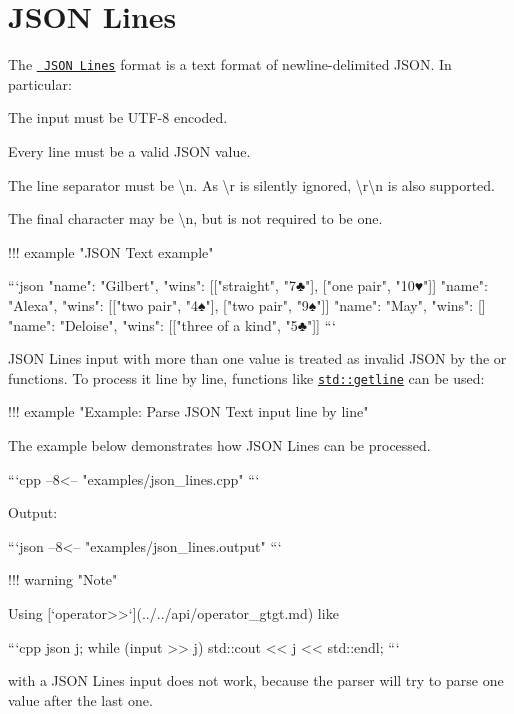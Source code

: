 \chapter{JSON Lines}
\hypertarget{md_build_2dt__core_2__deps_2nlohmann__json-src_2docs_2mkdocs_2docs_2features_2parsing_2json__lines}{}\label{md_build_2dt__core_2__deps_2nlohmann__json-src_2docs_2mkdocs_2docs_2features_2parsing_2json__lines}
\label{md_build_2dt__core_2__deps_2nlohmann__json-src_2docs_2mkdocs_2docs_2features_2parsing_2json__lines_autotoc_md1422}%
%
 The \href{https://jsonlines.org}{\texttt{ JSON Lines}} format is a text format of newline-\/delimited JSON. In particular\+:


\begin{DoxyEnumerate}
\item The input must be UTF-\/8 encoded.
\item Every line must be a valid JSON value.
\item The line separator must be {\ttfamily \textbackslash{}n}. As {\ttfamily \textbackslash{}r} is silently ignored, {\ttfamily \textbackslash{}r\textbackslash{}n} is also supported.
\item The final character may be {\ttfamily \textbackslash{}n}, but is not required to be one.
\end{DoxyEnumerate}

!!! example "{}\+JSON Text example"{} \begin{DoxyVerb}```json
{"name": "Gilbert", "wins": [["straight", "7♣"], ["one pair", "10♥"]]}
{"name": "Alexa", "wins": [["two pair", "4♠"], ["two pair", "9♠"]]}
{"name": "May", "wins": []}
{"name": "Deloise", "wins": [["three of a kind", "5♣"]]}
```
\end{DoxyVerb}
 JSON Lines input with more than one value is treated as invalid JSON by the  or  functions. To process it line by line, functions like \href{https://en.cppreference.com/w/cpp/string/basic_string/getline}{\texttt{ {\ttfamily std\+::getline}}} can be used\+:

!!! example "{}\+Example\+: Parse JSON Text input line by line"{} \begin{DoxyVerb}The example below demonstrates how JSON Lines can be processed.

```cpp
--8<-- "examples/json_lines.cpp"
```

Output:

```json
--8<-- "examples/json_lines.output"
```
\end{DoxyVerb}
 !!! warning "{}\+Note"{} \begin{DoxyVerb}Using [`operator>>`](../../api/operator_gtgt.md) like

```cpp
json j;
while (input >> j)
{
    std::cout << j << std::endl;
}
```

with a JSON Lines input does not work, because the parser will try to parse one value after the last one.
\end{DoxyVerb}
 